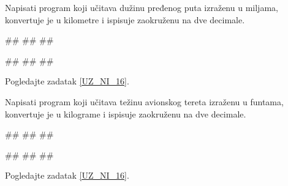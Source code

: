 \begin{Exercise}[label=UZ_NI_17] 
Napisati program koji učitava dužinu pređenog puta izraženu u miljama, konvertuje je u kilometre i ispisuje zaokruženu na dve decimale. 
   
\begin{miditest}
\begin{upotreba}{1}
#\naslovInt#
##
##
\end{upotreba}
\end{miditest}  
\begin{miditest}
\begin{upotreba}{2}
#\naslovInt#
##
##
\end{upotreba}
\end{miditest}   

\end{Exercise}
\ifresenja
\begin{Answer}[ref=UZ_NI_17]
Pogledajte zadatak \ref{UZ_NI_16}.
\end{Answer}
\fi


\begin{Exercise}[label=UZ_NI_18] 
Napisati program koji učitava težinu avionskog tereta izraženu u funtama, konvertuje je u kilograme i ispisuje zaokruženu na dve decimale. 

\begin{miditest}
\begin{upotreba}{1}
#\naslovInt#
##
##
\end{upotreba}
\end{miditest}  
\begin{miditest}
\begin{upotreba}{2}
#\naslovInt#
##
##
\end{upotreba}
\end{miditest}   
\end{Exercise}
\ifresenja
\begin{Answer}[ref=UZ_NI_18]
Pogledajte zadatak \ref{UZ_NI_16}.
\end{Answer}
\fi


